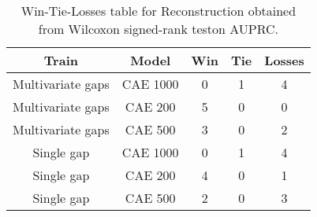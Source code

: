 \begin{table}[H]
\centering
\begin{tabular}{|c|c|c|c|c|}

    \textbf{Train} & \textbf{Model} &  \textbf{Win} &  \textbf{Tie} &  \textbf{Losses} \\
\hline

 Multivariate gaps &       CAE 1000 &             0 &             1 &                4 \\
\hline
 Multivariate gaps &        CAE 200 &             5 &             0 &                0 \\
\hline
 Multivariate gaps &        CAE 500 &             3 &             0 &                2 \\
\hline
        Single gap &       CAE 1000 &             0 &             1 &                4 \\
\hline
        Single gap &        CAE 200 &             4 &             0 &                1 \\
\hline
        Single gap &        CAE 500 &             2 &             0 &                3 \\
\hline

\end{tabular}
\caption{Win-Tie-Losses table for Reconstruction obtained from Wilcoxon signed-rank teston AUPRC.}
\label{tab:reconstruction_model_training_data_comparison}
\end{table}